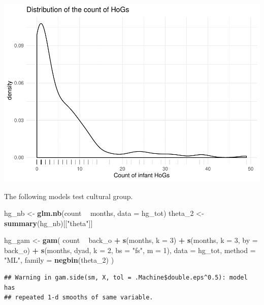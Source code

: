 \documentclass[]{article}
\newenvironment{Shaded}{\begin{snugshade}}{\end{snugshade}}
\newcommand{\DataTypeTok}[1]{\textcolor[rgb]{0.13,0.29,0.53}{#1}}
\newcommand{\DecValTok}[1]{\textcolor[rgb]{0.00,0.00,0.81}{#1}}
\newcommand{\KeywordTok}[1]{\textcolor[rgb]{0.13,0.29,0.53}{\textbf{#1}}}
\newcommand{\NormalTok}[1]{#1}
\newcommand{\OperatorTok}[1]{\textcolor[rgb]{0.81,0.36,0.00}{\textbf{#1}}}
\newcommand{\StringTok}[1]{\textcolor[rgb]{0.31,0.60,0.02}{#1}}
\begin{document}
\includegraphics{supplement_files/figure-latex/hog-1.pdf}

The following models test cultural group.

\begin{Shaded}
\begin{Highlighting}[]
\NormalTok{hg_nb <-}\StringTok{ }\KeywordTok{glm.nb}\NormalTok{(count }\OperatorTok{~}\StringTok{ }\NormalTok{months, }\DataTypeTok{data =}\NormalTok{ hg_tot)}
\NormalTok{theta_}\DecValTok{2}\NormalTok{ <-}\StringTok{ }\KeywordTok{summary}\NormalTok{(hg_nb)[[}\StringTok{"theta"}\NormalTok{]]}

\NormalTok{hg_gam <-}\StringTok{ }\KeywordTok{gam}\NormalTok{(}
\NormalTok{  count }\OperatorTok{~}
\StringTok{    }\NormalTok{back_o }\OperatorTok{+}
\StringTok{    }\KeywordTok{s}\NormalTok{(months, }\DataTypeTok{k =} \DecValTok{3}\NormalTok{) }\OperatorTok{+}
\StringTok{    }\KeywordTok{s}\NormalTok{(months, }\DataTypeTok{k =} \DecValTok{3}\NormalTok{, }\DataTypeTok{by =}\NormalTok{ back_o) }\OperatorTok{+}
\StringTok{    }\KeywordTok{s}\NormalTok{(months, dyad, }\DataTypeTok{k =} \DecValTok{2}\NormalTok{, }\DataTypeTok{bs =} \StringTok{"fs"}\NormalTok{, }\DataTypeTok{m =} \DecValTok{1}\NormalTok{),}
  \DataTypeTok{data =}\NormalTok{ hg_tot,}
  \DataTypeTok{method =} \StringTok{"ML"}\NormalTok{,}
  \DataTypeTok{family =} \KeywordTok{negbin}\NormalTok{(theta_}\DecValTok{2}\NormalTok{)}
\NormalTok{)}
\end{Highlighting}
\end{Shaded}

\begin{verbatim}
## Warning in gam.side(sm, X, tol = .Machine$double.eps^0.5): model has
## repeated 1-d smooths of same variable.
\end{verbatim}
\end{document}
